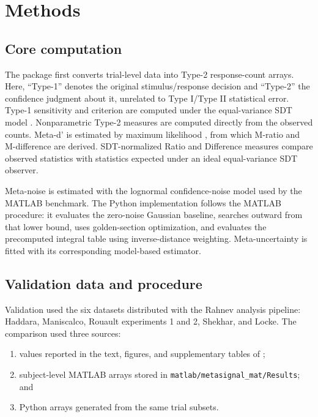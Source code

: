\documentclass{article}
\providecommand{\tightlist}{\setlength{\itemsep}{0pt}\setlength{\parskip}{0pt}} %
\begin{document}
\section{Methods}\label{methods}

\subsection{Core computation}\label{core-computation}

The package first converts trial-level data into Type-2 response-count arrays. Here, ``Type-1'' denotes the original stimulus/response decision and ``Type-2'' the confidence judgment about it, unrelated to Type I/Type II statistical error. Type-1 sensitivity and criterion are computed under the equal-variance SDT model \citep{green1966}. Nonparametric Type-2 measures are computed directly from the observed counts. Meta-d' is estimated by maximum likelihood \citep{maniscalco2012}, from which M-ratio and M-difference are derived. SDT-normalized Ratio and Difference measures compare observed statistics with statistics expected under an ideal equal-variance SDT observer.

Meta-noise is estimated with the lognormal confidence-noise model used by the MATLAB benchmark. The Python implementation follows the MATLAB procedure: it evaluates the zero-noise Gaussian baseline, searches outward from that lower bound, uses golden-section optimization, and evaluates the precomputed integral table using inverse-distance weighting. Meta-uncertainty is fitted with its corresponding model-based estimator.

\subsection{Validation data and procedure}\label{validation-data-and-procedure}

Validation used the six datasets distributed with the Rahnev analysis pipeline: Haddara, Maniscalco, Rouault experiments 1 and 2, Shekhar, and Locke. The comparison used three sources:

\begin{enumerate}
\def\labelenumi{\arabic{enumi}.}
\tightlist
\item
  values reported in the text, figures, and supplementary tables of \citet{rahnev2025};
\item
  subject-level MATLAB arrays stored in \texttt{matlab/metasignal\_mat/Results}; and
\item
  Python arrays generated from the same trial subsets.
\end{enumerate}
\end{document}
